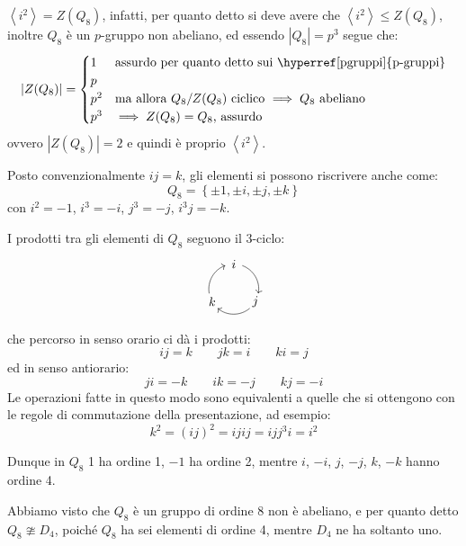 \documentclass[11pt]{scrartcl}
\begin{document}
\begin{remark}
    $\left<i^2\right> = Z(Q_8)$, infatti, per quanto detto si deve avere che $\left<i^2\right> \leqslant  Z(Q_8)$, inoltre $Q_8$ è un $p$-gruppo non abeliano, ed
    essendo $|Q_8| = p^3$ segue che:
        \[ |Z(Q_8)| = \begin{cases}
                        1 & \text{assurdo per quanto detto sui \hyperref[pgruppi]{p-gruppi}} \\
                        p \\
                        p^2 & \text{ma allora $Q_8/Z(Q_8)$ ciclico $\implies Q_8$ abeliano} \\
                        p^3 & \text{$\implies Z(Q_8) = Q_8$, assurdo}
                    \end{cases}
        \]
      ovvero $|Z(Q_8)|=2$ e quindi è proprio $\left<i^2\right>$.
\end{remark}

Posto convenzionalmente $ij = k$, gli elementi si possono riscrivere anche come:
    \[ Q_8 = \left\{\pm 1, \pm i, \pm j, \pm k\right\}
        \]
con $i^2 = -1$, $i^3 = -i$, $j^3 = -j$, $i^3j = -k$.

\begin{remark}
    [Prodotto in $Q_8$]
    I prodotti tra gli elementi di $Q_8$ seguono il $3$-ciclo:
    \[  \begin{tikzpicture}[->,scale=.7] 
        \foreach \a/\t in {90/i,-30/j,210/k}{
          \node (\t) at (\a:1cm) {$\t$};
          \draw (\a-20:1cm)  arc (\a-20:\a-100:1cm);
        } 
        \end{tikzpicture}
    \]
    che percorso in senso orario ci dà i prodotti:
    \[ ij = k \qquad jk = i \qquad ki = j
        \]
    ed in senso antiorario:
    \[ ji = -k \qquad ik = -j \qquad kj = -i
        \]
    Le operazioni fatte in questo modo sono equivalenti a quelle che si ottengono con le regole di commutazione della presentazione, ad esempio:
        \[ k^2 = (ij)^2 = i j i j = ijj^3i = i^2 
            \]
\end{remark}

\begin{remark}
    Dunque in $Q_8$ 1 ha ordine 1, $-1$ ha ordine 2, mentre $i$, $-i$, $j$, $-j$, $k$, $-k$ hanno ordine 4.   
\end{remark}

Abbiamo visto che $Q_8$ è un gruppo di ordine $8$ non è abeliano, e per quanto detto $Q_8 \ncong D_4$,
poiché $Q_8$ ha sei elementi di ordine 4, mentre $D_4$ ne ha soltanto uno. \\
\end{document}
